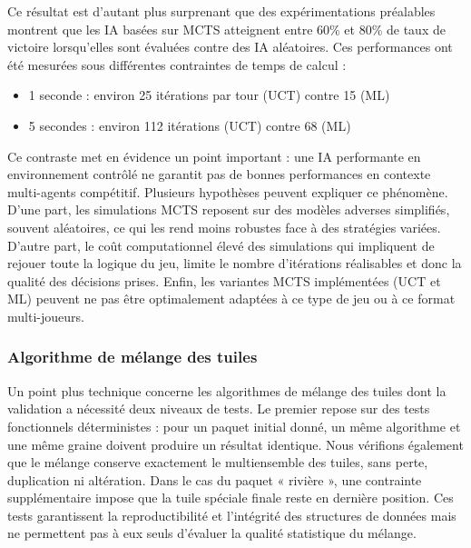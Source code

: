 \documentclass[11pt]{article}
\begin{document}
Ce résultat est d'autant plus surprenant que des expérimentations 
préalables montrent que les IA basées sur MCTS atteignent entre 60\% 
et 80\% de taux de victoire lorsqu'elles sont évaluées contre des IA 
aléatoires. Ces performances ont été mesurées sous différentes 
contraintes de temps de calcul :
\begin{itemize}
    \item[-] 1 seconde : environ 25 itérations par tour (UCT) contre 15 (ML)
    \item[-] 5 secondes : environ 112 itérations (UCT) contre 68 (ML)
\end{itemize}

Ce contraste met en évidence un point important : une IA performante en 
environnement contrôlé ne garantit pas de bonnes performances en contexte 
multi-agents compétitif. Plusieurs hypothèses peuvent expliquer ce 
phénomène. D'une part, les simulations MCTS reposent sur des modèles 
adverses simplifiés, souvent aléatoires, ce qui les rend moins robustes 
face à des stratégies variées. D'autre part, le coût computationnel élevé 
des simulations qui impliquent de rejouer toute la logique du jeu, limite 
le nombre d'itérations réalisables et donc la qualité des décisions prises. 
Enfin, les variantes MCTS implémentées (UCT et ML) peuvent ne pas être 
optimalement adaptées à ce type de jeu ou à ce format multi-joueurs.

\subsubsection{Algorithme de mélange des tuiles}
\label{subsubsec:melange}

Un point plus technique concerne les algorithmes de mélange des tuiles dont la validation a nécessité deux niveaux de tests. 
Le premier repose sur des tests fonctionnels déterministes : pour un paquet initial donné, un même algorithme et une même graine doivent produire un résultat identique. 
Nous vérifions également que le mélange conserve exactement le multiensemble des tuiles, sans perte, duplication ni altération. 
Dans le cas du paquet « rivière », une contrainte supplémentaire impose que la tuile spéciale finale reste en dernière position. 
Ces tests garantissent la reproductibilité et l'intégrité des structures de données mais ne permettent pas à eux seuls d'évaluer la qualité statistique du mélange.
\end{document}
